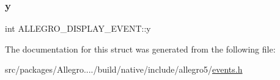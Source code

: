\subsubsection{\texorpdfstring{y}{y}}
{\footnotesize\ttfamily int A\+L\+L\+E\+G\+R\+O\+\_\+\+D\+I\+S\+P\+L\+A\+Y\+\_\+\+E\+V\+E\+N\+T\+::y}



The documentation for this struct was generated from the following file\+:\begin{DoxyCompactItemize}
\item 
src/packages/\+Allegro..../build/native/include/allegro5/\hyperlink{events_8h}{events.\+h}\end{DoxyCompactItemize}

